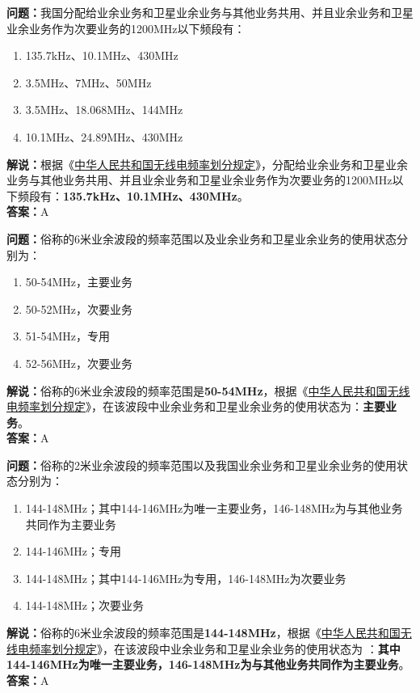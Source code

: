 \textbf{问题：}我国分配给业余业务和卫星业余业务与其他业务共用、并且业余业务和卫星业余业务作为次要业务的1200MHz以下频段有：
\begin{enumerate}[label=\Alph*), leftmargin=1.5cm]
  \item 135.7kHz、10.1MHz、430MHz
  \item 3.5MHz、7MHz、50MHz
  \item 3.5MHz、18.068MHz、144MHz
  \item 10.1MHz、24.89MHz、430MHz
\end{enumerate}
\textbf{解说：}根据《\href{https://www.miit.gov.cn/zwgk/zcwj/wjfb/txy/art/2020/art_066386284cd2449493586c81ccafed11.html}{中华人民共和国无线电频率划分规定}》，分配给业余业务和卫星业余业务与其他业务共用、并且业余业务和卫星业余业务作为次要业务的1200MHz以下频段有：\textbf{135.7kHz、10.1MHz、430MHz}。\\\textbf{答案：}A%

\textbf{问题：}俗称的6米业余波段的频率范围以及业余业务和卫星业余业务的使用状态分别为：
\begin{enumerate}[label=\Alph*), leftmargin=1.5cm]
  \item 50-54MHz，主要业务
  \item 50-52MHz，次要业务
  \item 51-54MHz，专用
  \item 52-56MHz，次要业务
\end{enumerate}
\textbf{解说：}俗称的6米业余波段的频率范围是\textbf{50-54MHz}，根据《\href{https://www.miit.gov.cn/zwgk/zcwj/wjfb/txy/art/2020/art_066386284cd2449493586c81ccafed11.html}{中华人民共和国无线电频率划分规定}》，在该波段中业余业务和卫星业余业务的使用状态为：\textbf{主要业务}。\\\textbf{答案：}A

\textbf{问题：}俗称的2米业余波段的频率范围以及我国业余业务和卫星业余业务的使用状态分别为：
\begin{enumerate}[label=\Alph*), leftmargin=1.5cm]
  \item 144-148MHz；其中144-146MHz为唯一主要业务，146-148MHz为与其他业务共同作为主要业务
  \item 144-146MHz；专用
  \item 144-148MHz；其中144-146MHz为专用，146-148MHz为次要业务
  \item 144-148MHz；次要业务
\end{enumerate}
\textbf{解说：}俗称的6米业余波段的频率范围是\textbf{144-148MHz}，根据《\href{https://www.miit.gov.cn/zwgk/zcwj/wjfb/txy/art/2020/art_066386284cd2449493586c81ccafed11.html}{中华人民共和国无线电频率划分规定}》，在该波段中业余业务和卫星业余业务的使用状态为 ：\textbf{其中144-146MHz为唯一主要业务，146-148MHz为与其他业务共同作为主要业务}。\\\textbf{答案：}A

